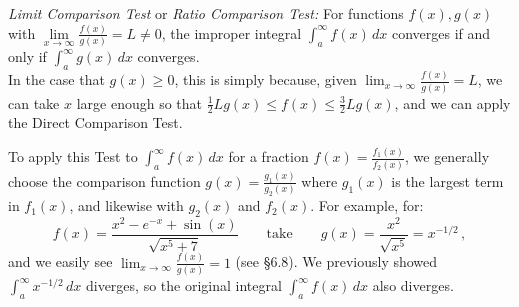 \documentclass[11pt]{article}
\begin{document}
\noindent
{\it Limit Comparison Test} or {\it Ratio Comparison Test:}
For functions $f(x), g(x)$ with $\lim\limits_{x\to\infty} \frac{f(x)}{g(x)} = L\neq 0$,
the improper integral $\int_a^\infty f(x)\,dx$ converges if and only if 
$\int_a^\infty g(x)\,dx$ converges.
\\[1em]
In the case that $g(x)\geq 0$, this is simply because, given $\lim_{x\to\infty} \frac{f(x)}{g(x)} = L$, we can take $x$ large enough so that 
$\frac12 L g(x)\leq f(x)\leq \frac32L g(x)$, and we can apply the Direct Comparison Test.

To apply this Test to $\int_a^\infty f(x)\,dx$ for a fraction $f(x)=\frac{f_1(x)}{f_2(x)}$,
we generally choose the comparison function
$g(x)=\frac{g_1(x)}{g_2(x)}$ where $g_1(x)$ is the
 largest term in $f_1(x)$, and likewise with $g_2(x)$ and
$f_2(x)$.
For example, for:
$$
f(x)=\frac{x^2-e^{-x}+\sin(x)}
{\sqrt{x^5+7}}\qquad\text{take}\qquad
g(x)=\frac{x^2}{\sqrt{x^5}}=x^{-1/2}\,,
$$
and we easily see $\lim_{x\to\infty} \frac{f(x)}{g(x)} = 1$ (see \S6.8).
We previously showed $\int_a^\infty x^{-1/2}\,dx$ diverges, so the original integral
$\int_a^\infty f(x)\,dx$ also diverges.
\end{document}
